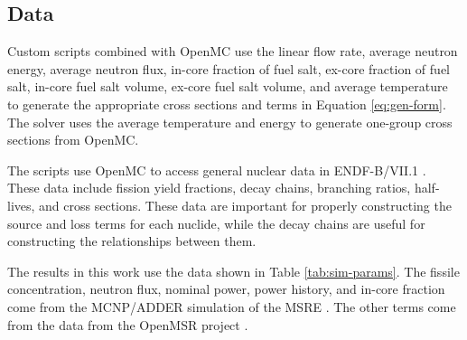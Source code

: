 \documentclass{style/nseJournal}
\begin{document}
\subsection{Data}
Custom scripts combined with OpenMC use the linear flow rate, average neutron energy, average neutron flux, in-core fraction of fuel salt, ex-core fraction of fuel salt, in-core fuel salt volume, ex-core fuel salt volume, and average temperature to generate the appropriate cross sections and terms in Equation \eqref{eq:gen-form}.
The solver uses the average temperature and energy to generate one-group cross sections from OpenMC.

The scripts use OpenMC to access general nuclear data in ENDF-B/VII.1 \cite{openmc, Chadwick20112887short}.
These data include fission yield fractions, decay chains, branching ratios, half-lives, and cross sections.
These data are important for properly constructing the source and loss terms for each nuclide, while the decay chains are useful for constructing the relationships between them.


The results in this work use the data shown in Table \ref{tab:sim-params}.
The fissile concentration, neutron flux, nominal power, power history, and in-core fraction come from the MCNP/ADDER simulation of the MSRE \cite{anderson_user_2022, fei_validation_2022}.
The other terms come from the data from the OpenMSR project \cite{openmsr}.
\end{document}
